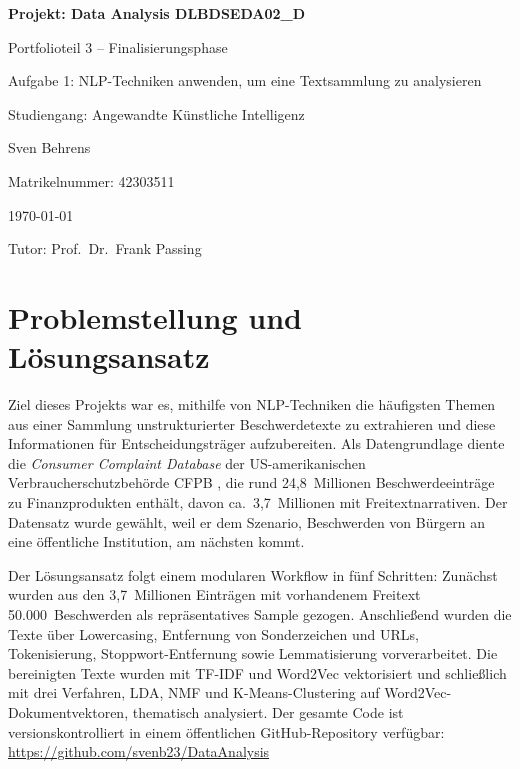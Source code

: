 \documentclass[a4paper,11pt]{article}
\begin{document}
\begin{titlepage}
    \thispagestyle{empty}
    \centering
    \vspace*{5cm}
    {\Huge\bfseries Projekt: Data Analysis DLBDSEDA02\_D \par}
    \vspace{1cm}
    {\Large Portfolioteil 3 -- Finalisierungsphase \par}
    \vspace{0.3cm}
    {\large Aufgabe 1: NLP-Techniken anwenden, um eine Textsammlung zu analysieren \par}
    \vspace{0.5cm}
    {\large Studiengang: Angewandte Künstliche Intelligenz \par}
    \vspace{0.5cm}
    {\large Sven Behrens \par}
    \vspace{0.5cm}
    {\large Matrikelnummer: 42303511 \par}
    \vspace{0.5cm}
    {\large \today \par}
    \vspace{0.5cm}
    {\large Tutor: Prof.~Dr.~Frank Passing \par}
\end{titlepage}

\setcounter{page}{1}


\section{Problemstellung und Lösungsansatz}

Ziel dieses Projekts war es, mithilfe von NLP-Techniken die häufigsten Themen aus einer Sammlung
unstrukturierter Beschwerdetexte zu extrahieren und diese Informationen für Entscheidungsträger
aufzubereiten. Als Datengrundlage diente die \textit{Consumer Complaint Database} der
US-amerikanischen Verbraucherschutzbehörde CFPB \parencite{cfpb2024}, die rund 24,8~Millionen
Beschwerdeeinträge zu Finanzprodukten enthält, davon ca.~3,7~Millionen mit Freitextnarrativen.
Der Datensatz wurde gewählt, weil er dem Szenario, Beschwerden von Bürgern an eine öffentliche
Institution, am nächsten kommt.

Der Lösungsansatz folgt einem modularen Workflow in fünf Schritten: Zunächst wurden aus
den 3,7~Millionen Einträgen mit vorhandenem Freitext 50.000~Beschwerden als repräsentatives
Sample gezogen. Anschließend wurden die Texte über Lowercasing, Entfernung von Sonderzeichen
und URLs, Tokenisierung, Stoppwort-Entfernung sowie Lemmatisierung vorverarbeitet. Die
bereinigten Texte wurden mit TF-IDF und Word2Vec vektorisiert und schließlich mit drei
Verfahren, LDA, NMF und K-Means-Clustering auf Word2Vec-Dokumentvektoren, thematisch
analysiert. Der gesamte Code ist versionskontrolliert in einem öffentlichen GitHub-Repository
verfügbar: \url{https://github.com/svenb23/DataAnalysis}
\end{document}
